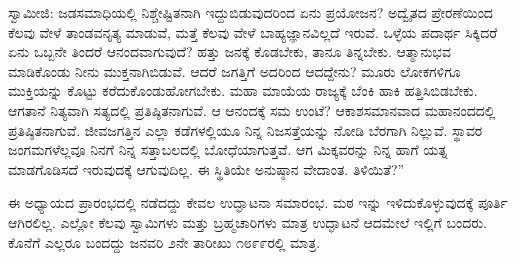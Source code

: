  ಸ್ವಾಮೀಜಿ: ಜಡಸಮಾಧಿಯಲ್ಲಿ ನಿಶ್ಚೇಷ್ಟಿತನಾಗಿ ಇದ್ದುಬಿಡುವುದರಿಂದ ಏನು ಪ್ರಯೋಜನ? ಅದ್ವೈತದ ಪ್ರೇರಣೆಯಿಂದ ಕೆಲವು ವೇಳೆ ತಾಂಡವನೃತ್ಯ ಮಾಡುವೆ, ಮತ್ತೆ ಕೆಲವು ವೇಳೆ ಬಾಹ್ಯಜ್ಞಾನವಿಲ್ಲದೆ ಇರುವೆ. ಒಳ್ಳೆಯ ಪದಾರ್ಥ ಸಿಕ್ಕಿದರೆ ಏನು ಒಬ್ಬನೇ ತಿಂದರೆ ಆನಂದವಾಗುವುದೆ? ಹತ್ತು ಜನಕ್ಕೆ ಕೊಡಬೇಕು, ತಾನೂ ತಿನ್ನಬೇಕು. ಆತ್ಮಾನುಭವ ಮಾಡಿಕೊಂಡು ನೀನು ಮುಕ್ತನಾಗಿಬಿಡುವೆ. ಆದರೆ ಜಗತ್ತಿಗೆ ಅದರಿಂದ ಆದದ್ದೇನು? ಮೂರು ಲೋಕಗಳಿಗೂ ಮುಕ್ತಿಯನ್ನು ಕೊಟ್ಟು ಕರೆದುಕೊಂಡುಹೋಗಬೇಕು. ಮಹಾ ಮಾಯೆಯ ರಾಜ್ಯಕ್ಕೆ ಬೆಂಕಿ ಹಾಕಿ ಹತ್ತಿಸಿಬಿಡಬೇಕು. ಆಗತಾನೆ ನಿತ್ಯವಾಗಿ ಸತ್ಯದಲ್ಲಿ ಪ್ರತಿಷ್ಠಿತನಾಗುವೆ. ಆ ಆನಂದಕ್ಕೆ ಸಮ ಉಂಟೆ? ಆಕಾಶಸಮಾನವಾದ ಮಹಾನಂದದಲ್ಲಿ ಪ್ರತಿಷ್ಠಿತನಾಗುವೆ. ಜೀವಜಗತ್ತಿನ ಎಲ್ಲಾ ಕಡೆಗಳಲ್ಲಿಯೂ ನಿನ್ನ ನಿಜಸತ್ತೆಯನ್ನು ನೋಡಿ ಬೆರಗಾಗಿ ನಿಲ್ಲುವೆ. ಸ್ಥಾವರ ಜಂಗಮಗಳೆಲ್ಲವೂ ನಿನಗೆ ನಿನ್ನ ಸತ್ತಾಬಲದಲ್ಲಿ ಬೋಧೆಯಾಗುತ್ತವೆ. ಆಗ ಮಿಕ್ಕವರನ್ನು ನಿನ್ನ ಹಾಗೆ ಯತ್ನ ಮಾಡಗೊಡಿಸದೆ ಇರುವುದಕ್ಕೆ ಆಗುವುದಿಲ್ಲ. ಈ ಸ್ಥಿತಿಯೇ ಅನುಷ್ಠಾನ ವೇದಾಂತ. ತಿಳಿಯಿತೆ?” 

 ಈ ಅಧ್ಯಾಯದ ಪ್ರಾರಂಭದಲ್ಲಿ ನಡೆದದ್ದು ಕೇವಲ ಉದ್ಘಾಟನಾ ಸಮಾರಂಭ. ಮಠ ಇನ್ನು ಇಳಿದುಕೊಳ್ಳುವುದಕ್ಕೆ ಪೂರ್ತಿ ಆಗಿರಲಿಲ್ಲ. ಎಲ್ಲೋ ಕೆಲವು ಸ್ವಾಮಿಗಳು ಮತ್ತು ಬ್ರಹ್ಮಚಾರಿಗಳು ಮಾತ್ರ ಉದ್ಘಾಟನೆ ಆದಮೇಲೆ ಇಲ್ಲಿಗೆ ಬಂದರು. ಕೊನೆಗೆ ಎಲ್ಲರೂ ಬಂದದ್ದು ಜನವರಿ ೨ನೇ ತಾರೀಖು ೧೮೯೯ರಲ್ಲಿ ಮಾತ್ರ. 

